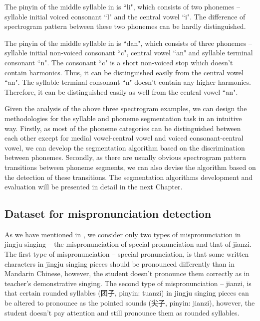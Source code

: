The pinyin of the middle syllable in  is ``li", which consists of two phonemes -- syllable initial voiced consonant ``l" and the central vowel ``i". The difference of spectrogram pattern between these two phonemes can be hardly distinguished.

The pinyin of the middle syllable in  is ``dan", which consists of three phonemes -- syllable initial non-voiced consonant ``c", central vowel ``an" and syllable terminal consonant ``n". The consonant ``c" is a short non-voiced stop which doesn't contain harmonics. Thus, it can be distinguished easily from the central vowel ``an". The syllable terminal consonant ``n" doesn't contain any higher harmonics. Therefore, it can be distinguished easily as well from the central vowel ``an".

Given the analysis of the above three spectrogram examples, we can design the methodologies for the syllable and phoneme segmentation task in an intuitive way. Firstly, as most of the phoneme categories can be distinguished between each other except for medial vowel-central vowel and voiced consonant-central vowel, we can develop the segmentation algorithm based on the discrimination between phonemes. Secondly, as there are usually obvious spectrogram pattern transitions between phoneme segments, we can also devise the algorithm based on the detection of these transitions. The segmentation algorithms development and evaluation will be presented in detail in the next Chapter.

\subsection{Dataset for mispronunciation detection}\label{sec:ch4:dataset_mispronunciation}

As we have mentioned in , we consider only two types of mispronunciation in jingju singing -- the mispronunciation of special pronunciation and that of jianzi. The first type of mispronunciation -- special pronunciation, is that some written characters in jingju singing pieces should be pronounced differently than in Mandarin Chinese, however, the student doesn't pronounce them correctly as in teacher's demonstrative singing. The second type of mispronunciation -- jianzi, is that certain rounded syllables (团子, pinyin: tuanzi) in jingju singing pieces can be altered to pronounce as the pointed sounds (尖子, pinyin: jianzi), however, the student doesn't pay attention and still pronounce them as rounded syllables. 

